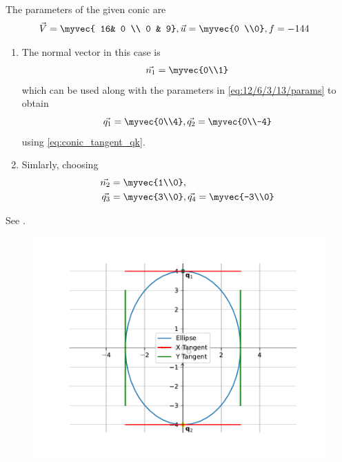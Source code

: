 The parameters of the given conic are
\begin{align}
\vec{V} &= \myvec{	16& 0 \\
			          0 & 9}  
		    , \vec{u} = \myvec{0 \\0}, f = -144
		\label{eq:12/6/3/13/params}
	\end{align}
\begin{enumerate}
	\item The 
normal vector  in this case is
\begin{align}
		\vec{n_1}=\myvec{0\\1}
\end{align}
which can be used along with the parameters in 
		\eqref{eq:12/6/3/13/params}
		to obtain 
\begin{equation}
\vec{q_1}=\myvec{0\\4},
\vec{q_2}=\myvec{0\\-4}
\end{equation}
using 
\eqref{eq:conic_tangent_qk}.
\item Simlarly, 
	choosing
\begin{align}
	\vec{n_2}&=\myvec{1\\0},
	\\
	\vec{q_3}&=\myvec{3\\0},
	\vec{q_4}=\myvec{-3\\0}
\end{align}
\end{enumerate}
		See .
	\begin{figure}[H]
		\centering
 \includegraphics[width=0.75\columnwidth]{chapters/12/6/3/13/figs/fig.pdf}
		\caption{}
		\label{fig:12/6/3/13}
  	\end{figure}
